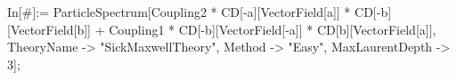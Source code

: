 In[\#]:= ParticleSpectrum[Coupling2 * CD[-a][VectorField[a]] * CD[-b][VectorField[b]] + Coupling1 * CD[-b][VectorField[-a]] * CD[b][VectorField[a]], TheoryName -> "SickMaxwellTheory", Method -> "Easy", MaxLaurentDepth -> 3]; 